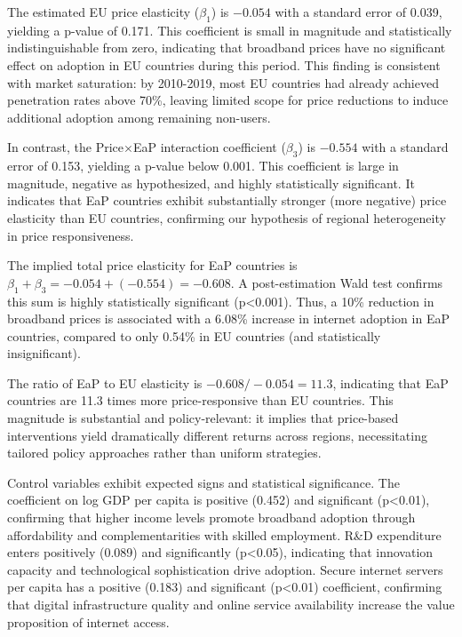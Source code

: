 \documentclass[12pt,review]{elsarticle}
\begin{document}
The estimated EU price elasticity ($\beta_1$) is $-0.054$ with a standard error of 0.039, yielding a p-value of 0.171. This coefficient is small in magnitude and statistically indistinguishable from zero, indicating that broadband prices have no significant effect on adoption in EU countries during this period. This finding is consistent with market saturation: by 2010-2019, most EU countries had already achieved penetration rates above 70\%, leaving limited scope for price reductions to induce additional adoption among remaining non-users.

In contrast, the Price$\times$EaP interaction coefficient ($\beta_3$) is $-0.554$ with a standard error of 0.153, yielding a p-value below 0.001. This coefficient is large in magnitude, negative as hypothesized, and highly statistically significant. It indicates that EaP countries exhibit substantially stronger (more negative) price elasticity than EU countries, confirming our hypothesis of regional heterogeneity in price responsiveness.

The implied total price elasticity for EaP countries is $\beta_1 + \beta_3 = -0.054 + (-0.554) = -0.608$. A post-estimation Wald test confirms this sum is highly statistically significant (p<0.001). Thus, a 10\% reduction in broadband prices is associated with a 6.08\% increase in internet adoption in EaP countries, compared to only 0.54\% in EU countries (and statistically insignificant).

The ratio of EaP to EU elasticity is $-0.608 / -0.054 = 11.3$, indicating that EaP countries are 11.3 times more price-responsive than EU countries. This magnitude is substantial and policy-relevant: it implies that price-based interventions yield dramatically different returns across regions, necessitating tailored policy approaches rather than uniform strategies.

Control variables exhibit expected signs and statistical significance. The coefficient on log GDP per capita is positive (0.452) and significant (p<0.01), confirming that higher income levels promote broadband adoption through affordability and complementarities with skilled employment. R\&D expenditure enters positively (0.089) and significantly (p<0.05), indicating that innovation capacity and technological sophistication drive adoption. Secure internet servers per capita has a positive (0.183) and significant (p<0.01) coefficient, confirming that digital infrastructure quality and online service availability increase the value proposition of internet access.
\end{document}
